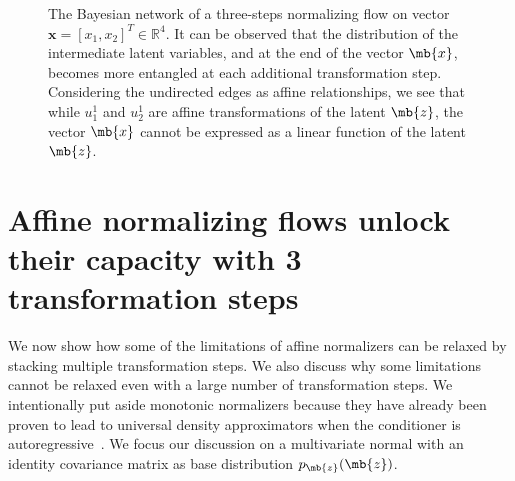 \begin{figure}
    \centering
     \caption{The Bayesian network of a three-steps normalizing flow on vector $\mathbf{x} = [x_1, x_2]^T \in \mathbb{R}^4$. It can be observed that the distribution of the intermediate latent variables, and at the end of the vector $\mb{x}$, becomes more entangled at each additional transformation step. Considering the undirected edges as affine relationships, we see that while $u_1^1$ and $u_2^1$ are affine transformations of the latent $\mb{z}$, the vector $\mb{x}$ cannot be expressed as a linear function of the latent $\mb{z}$.}
     \label{fig:2d-three-steps-flows}
     \vspace{-1.5em}


\end{figure}


\section{Affine normalizing flows unlock their capacity with 3 transformation steps}

We now show how some of the limitations of affine normalizers can be relaxed by stacking multiple transformation steps.
We also discuss why some limitations cannot be relaxed even with a large number of transformation steps. We intentionally put aside monotonic normalizers because they have already been proven to lead to universal density approximators when the conditioner is autoregressive~\cite{NAF}.
We focus our discussion on a multivariate normal with an identity covariance matrix as base distribution $p_{\mb{z}}(\mb{z})$. %

